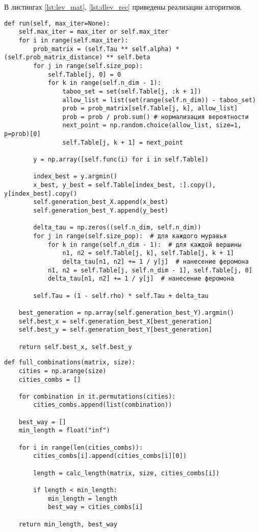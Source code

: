 В листингах \ref{lst:lev_mat}, \ref{lst:dlev_rec} приведены реализации алгоритмов.
\newpage
\begin{lstlisting}[label=lst:lev_mat,caption=Муравьиный алгоритм.]
def run(self, max_iter=None):
	self.max_iter = max_iter or self.max_iter
	for i in range(self.max_iter):
		prob_matrix = (self.Tau ** self.alpha) * (self.prob_matrix_distance) ** self.beta
		for j in range(self.size_pop):
			self.Table[j, 0] = 0
			for k in range(self.n_dim - 1):
				taboo_set = set(self.Table[j, :k + 1])
				allow_list = list(set(range(self.n_dim)) - taboo_set)
				prob = prob_matrix[self.Table[j, k], allow_list]
				prob = prob / prob.sum() # нормализация вероятности
				next_point = np.random.choice(allow_list, size=1, p=prob)[0]
				self.Table[j, k + 1] = next_point
						
		y = np.array([self.func(i) for i in self.Table])
		
		index_best = y.argmin()
		x_best, y_best = self.Table[index_best, :].copy(), y[index_best].copy()
		self.generation_best_X.append(x_best)
		self.generation_best_Y.append(y_best)
		
		delta_tau = np.zeros((self.n_dim, self.n_dim))
		for j in range(self.size_pop):  # для каждого муравья
			for k in range(self.n_dim - 1):  # для каждой вершины
				n1, n2 = self.Table[j, k], self.Table[j, k + 1]
				delta_tau[n1, n2] += 1 / y[j]  # нанесение феромона
			n1, n2 = self.Table[j, self.n_dim - 1], self.Table[j, 0]
			delta_tau[n1, n2] += 1 / y[j]  # нанесение феромона
		
		self.Tau = (1 - self.rho) * self.Tau + delta_tau
		
	best_generation = np.array(self.generation_best_Y).argmin()
	self.best_x = self.generation_best_X[best_generation]
	self.best_y = self.generation_best_Y[best_generation]
	
	return self.best_x, self.best_y
\end{lstlisting}
\newpage
\begin{lstlisting}[label=lst:dlev_rec,caption= Алгоритм полного перебора.]
def full_combinations(matrix, size):
	cities = np.arange(size)
	cities_combs = []
	
	for combination in it.permutations(cities):
		cities_combs.append(list(combination))
	
	best_way = []
	min_length = float("inf")
	
	for i in range(len(cities_combs)):
		cities_combs[i].append(cities_combs[i][0])
		
		length = calc_length(matrix, size, cities_combs[i])
		
		if length < min_length:
			min_length = length
			best_way = cities_combs[i]
	
	return min_length, best_way
\end{lstlisting}
\newpage
